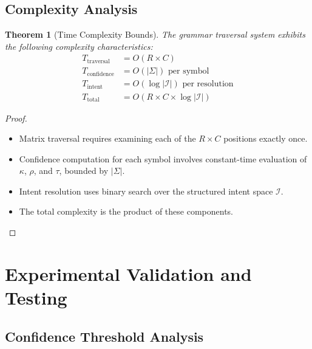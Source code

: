 \documentclass[11pt,a4paper]{article}
\newtheorem{theorem}{Theorem}[section]
\theoremstyle{definition}
\theoremstyle{remark}
\begin{document}
\subsection{Complexity Analysis}
\label{subsec:complexity-analysis}

\begin{theorem}[Time Complexity Bounds]
\label{thm:time-complexity}
The grammar traversal system exhibits the following complexity characteristics:
\begin{align}
T_{\text{traversal}} &= O(R \times C) \\
T_{\text{confidence}} &= O(|\Sigma|) \text{ per symbol} \\
T_{\text{intent}} &= O(\log |\mathcal{I}|) \text{ per resolution} \\
T_{\text{total}} &= O(R \times C \times \log |\mathcal{I}|)
\end{align}
\end{theorem}

\begin{proof}
\begin{itemize}
\item Matrix traversal requires examining each of the $R \times C$ positions exactly once.
\item Confidence computation for each symbol involves constant-time evaluation of $\kappa$, $\rho$, and $\tau$, bounded by $|\Sigma|$.
\item Intent resolution uses binary search over the structured intent space $\mathcal{I}$.
\item The total complexity is the product of these components.
\end{itemize}
\end{proof}


\section{Experimental Validation and Testing}
\label{sec:experimental-validation}

\subsection{Confidence Threshold Analysis}
\label{subsec:threshold-analysis}
\end{document}

